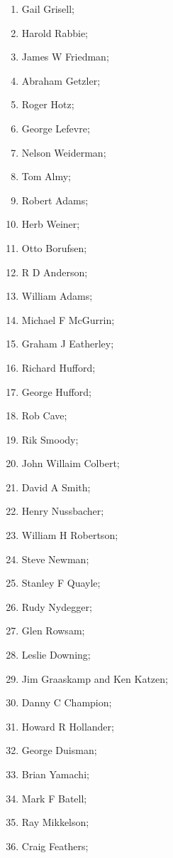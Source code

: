 \documentclass{article}
\theoremstyle{definition}
\begin{document}
\begin{multicols}{3}
    \begin{enumerate}
        \item Gail Grisell;
        \item Harold Rabbie;
        \item James W Friedman;
        \item Abraham Getzler;
        \item Roger Hotz;
        \item George Lefevre;
        \item Nelson Weiderman;
        \item Tom Almy;
        \item Robert Adams;
        \item Herb Weiner;
        \item Otto Borufsen;
        \item R D Anderson;
        \item William Adams;
        \item Michael F McGurrin;
        \item Graham J Eatherley;
        \item Richard Hufford;
        \item George Hufford;
        \item Rob Cave;
        \item Rik Smoody;
        \item John Willaim Colbert;
        \item David A Smith;
        \item Henry Nussbacher;
        \item William H Robertson;
        \item Steve Newman;
        \item Stanley F Quayle;
        \item Rudy Nydegger;
        \item Glen Rowsam;
        \item Leslie Downing;
        \item Jim Graaskamp and Ken Katzen;
        \item Danny C Champion;
        \item Howard R Hollander;
        \item George Duisman;
        \item Brian Yamachi;
        \item Mark F Batell;
        \item Ray Mikkelson;
        \item Craig Feathers;

\end{enumerate}
\end{multicols}
\end{document}
